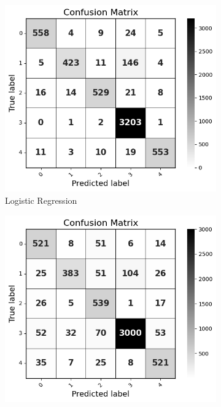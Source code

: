 \begin{figure}[H]
    \centering
    \begin{subfigure}[b]{0.49\textwidth}
        \centering
        \includegraphics[width=\textwidth]{Images/LR Confusion Matrix.png}
        \caption{Logistic Regression}
        \label{LRCM}  %
    \end{subfigure}
    \vspace{0.25cm}
    \hfill
    \begin{subfigure}[b]{0.49\textwidth}
        \centering
        \includegraphics[width=\textwidth]{Images/NB Confusion Matrix.png}

\end{subfigure}
\end{figure}
